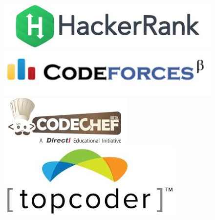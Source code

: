 \documentclass{beamer}
\begin{document}
\begin{frame}
\begin{figure}[!htb]
     \endminipage\hfill
	\end{figure}
	\begin{figure}[!htb]
      \href{https://www.hackerrank.com/}{\includegraphics[width=\linewidth]{images/judges/hackerrank}}
     \endminipage\hfill
      \href{http://codeforces.com/}{\includegraphics[width=\linewidth]{images/judges/codeforces}}
     \endminipage\hfill
      \href{https://www.codechef.com/}{\includegraphics[width=\linewidth]{images/judges/codechef}}
     \endminipage\hfill
      \href{https://www.topcoder.com/}{\includegraphics[width=\linewidth]{images/judges/topcoder}}
     \endminipage\hfill
	\end{figure}
    \begin{figure}[!htb]

\end{figure}
\end{frame}
\end{document}
